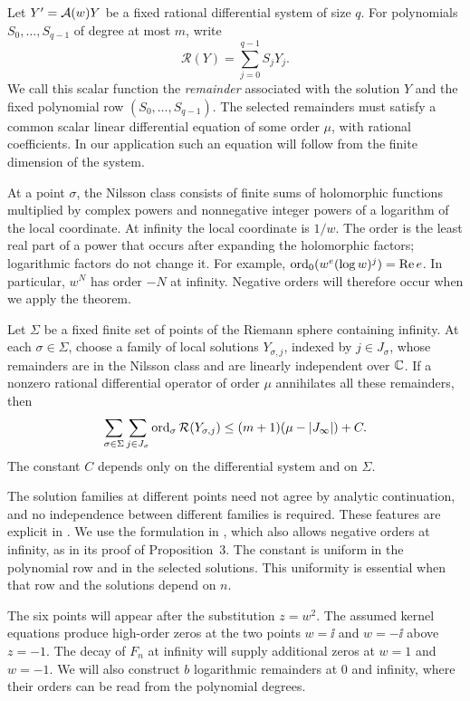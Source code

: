 Let $Y'=\mathcal A(w)Y$ be a fixed rational differential system of size $q$.
For polynomials $S_0,\ldots,S_{q-1}$ of degree at most $m$, write
\[
 \mathcal R(Y)=\sum_{j=0}^{q-1}S_jY_j.
\]
We call this scalar function the \emph{remainder} associated with the
solution $Y$ and the fixed polynomial row $(S_0,\ldots,S_{q-1})$.
The selected remainders must satisfy a common scalar linear differential
equation of some order $\mu$, with rational coefficients. In our
application such an equation will follow from the finite dimension of
the system.

At a point $\sigma$, the Nilsson class consists of finite sums of
holomorphic functions multiplied by complex powers and nonnegative
integer powers of a logarithm of the local coordinate.
At infinity the local coordinate is $1/w$.
The order is the least real part of a power that occurs after expanding
the holomorphic factors; logarithmic factors do not change it. For example,
$\operatorname{ord}_0(w^e(\log w)^j)=\operatorname{Re}e$.
In particular, $w^N$ has order $-N$ at infinity. Negative orders will
therefore occur when we apply the theorem.

\begin{proposition}\label{prop:multiplicity}
Let $\Sigma$ be a fixed finite set of points of the Riemann sphere
containing infinity. At each $\sigma\in\Sigma$, choose a family of local
solutions $Y_{\sigma,j}$, indexed by $j\in J_\sigma$, whose remainders
are in the Nilsson class and are linearly independent over $\mathbb C$.
If a nonzero rational differential operator of order $\mu$ annihilates
all these remainders, then
\[
 \sum_{\sigma\in\Sigma}\sum_{j\in J_\sigma}
       \operatorname{ord}_\sigma\mathcal R(Y_{\sigma,j})
       \leq(m+1)(\mu-|J_\infty|)+C.
\]
The constant $C$ depends only on the differential system and on $\Sigma$.
\end{proposition}

The solution families at different points need not agree by analytic
continuation, and no independence between different families is required.
These features are explicit in \cite[Section~3.1]{F18}.
We use the formulation in \cite{F26}, which also allows negative orders
at infinity, as in its proof of Proposition~3.
The constant is uniform in the polynomial row and in the selected
solutions. This uniformity is essential when that row and the solutions
depend on $n$.

The six points will appear after the substitution $z=w^2$. The assumed
kernel equations produce high-order zeros at the two points $w=\ii$
and $w=-\ii$ above $z=-1$. The decay of $F_n$ at infinity will supply
additional zeros at $w=1$ and $w=-1$. We will also construct $b$
logarithmic remainders at $0$ and infinity, where their orders can be
read from the polynomial degrees.

